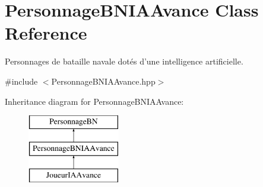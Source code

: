 \hypertarget{classPersonnageBNIAAvance}{\section{Personnage\-B\-N\-I\-A\-Avance Class Reference}
\label{classPersonnageBNIAAvance}
}


Personnages de bataille navale dotés d'une intelligence artificielle.  




{\ttfamily \#include $<$Personnage\-B\-N\-I\-A\-Avance.\-hpp$>$}

Inheritance diagram for Personnage\-B\-N\-I\-A\-Avance\-:\begin{figure}[H]
\begin{center}
\leavevmode
\includegraphics[height=3.000000cm]{classPersonnageBNIAAvance}
\end{center}
\end{figure}
